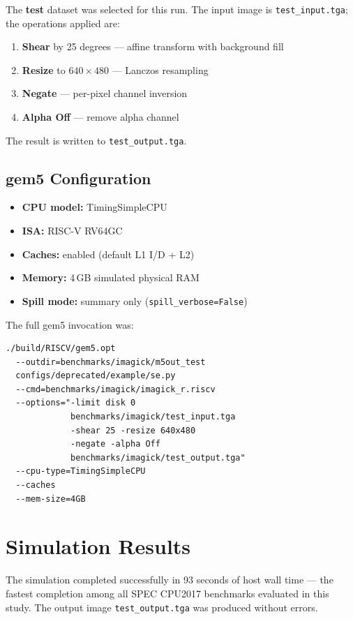 \documentclass[conference]{IEEEtran}
\begin{document}
The \textbf{test} dataset was selected for this run. The input image
is \texttt{test\_input.tga}; the operations applied are:
\begin{enumerate}
    \item \textbf{Shear} by 25 degrees --- affine transform with background fill
    \item \textbf{Resize} to $640 \times 480$ --- Lanczos resampling
    \item \textbf{Negate} --- per-pixel channel inversion
    \item \textbf{Alpha Off} --- remove alpha channel
\end{enumerate}
The result is written to \texttt{test\_output.tga}.

\subsection{gem5 Configuration}

\begin{itemize}
    \item \textbf{CPU model:}   TimingSimpleCPU
    \item \textbf{ISA:}         RISC-V RV64GC
    \item \textbf{Caches:}      enabled (default L1 I/D + L2)
    \item \textbf{Memory:}      4\,GB simulated physical RAM
    \item \textbf{Spill mode:}  summary only (\texttt{spill\_verbose=False})
\end{itemize}

The full gem5 invocation was:

\begin{verbatim}
./build/RISCV/gem5.opt
  --outdir=benchmarks/imagick/m5out_test
  configs/deprecated/example/se.py
  --cmd=benchmarks/imagick/imagick_r.riscv
  --options="-limit disk 0
             benchmarks/imagick/test_input.tga
             -shear 25 -resize 640x480
             -negate -alpha Off
             benchmarks/imagick/test_output.tga"
  --cpu-type=TimingSimpleCPU
  --caches
  --mem-size=4GB
\end{verbatim}

\section{Simulation Results}

The simulation completed successfully in 93 seconds of host wall time
--- the fastest completion among all SPEC CPU2017 benchmarks evaluated
in this study. The output image \texttt{test\_output.tga} was produced
without errors.
\end{document}
